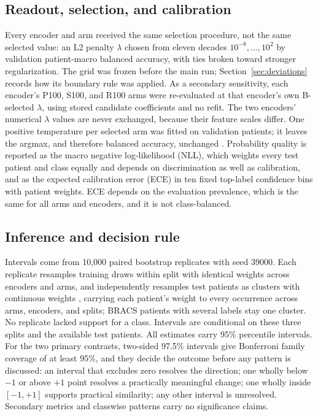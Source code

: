 \documentclass[11pt]{article}
\begin{document}
\subsection{Readout, selection, and calibration}
Every encoder and arm received the same selection procedure, not the same selected value: an L2 penalty $\lambda$ chosen from eleven decades $10^{-8},\dots,10^{2}$ by validation patient-macro balanced accuracy, with ties broken toward stronger regularization. The grid was frozen before the main run; Section~\ref{sec:deviations} records how its boundary rule was applied. As a secondary sensitivity, each encoder's P100, S100, and R100 arms were re-evaluated at that encoder's own B-selected $\lambda$, using stored candidate coefficients and no refit. The two encoders' numerical $\lambda$ values are never exchanged, because their feature scales differ. One positive temperature per selected arm was fitted on validation patients; it leaves the argmax, and therefore balanced accuracy, unchanged \citep{guo2017calibration}. Probability quality is reported as the macro negative log-likelihood (NLL), which weights every test patient and class equally and depends on discrimination as well as calibration, and as the expected calibration error (ECE) in ten fixed top-label confidence bins with patient weights. ECE depends on the evaluation prevalence, which is the same for all arms and encoders, and it is not class-balanced.

\subsection{Inference and decision rule}
Intervals come from 10,000 paired bootstrap replicates with seed 39000. Each replicate resamples training draws within split with identical weights across encoders and arms, and independently resamples test patients as clusters with continuous weights \citep{rubin1981bayesian}, carrying each patient's weight to every occurrence across arms, encoders, and splits; BRACS patients with several labels stay one cluster. No replicate lacked support for a class. Intervals are conditional on these three splits and the available test patients. All estimates carry 95\% percentile intervals. For the two primary contrasts, two-sided 97.5\% intervals give Bonferroni family coverage of at least 95\%, and they decide the outcome before any pattern is discussed: an interval that excludes zero resolves the direction; one wholly below $-1$ or above $+1$ point resolves a practically meaningful change; one wholly inside $[-1,+1]$ supports practical similarity; any other interval is unresolved. Secondary metrics and classwise patterns carry no significance claims.






\appendix

\end{document}
